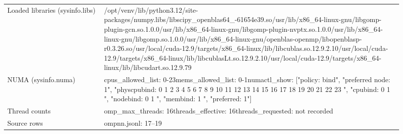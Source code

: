 \begin{longtable}{>{\raggedright\arraybackslash}p{0.23\linewidth}>{\raggedright\arraybackslash}p{0.71\linewidth}}
Loaded libraries (sysinfo.libs) & /\allowbreak{}opt/\allowbreak{}venv/\allowbreak{}lib/\allowbreak{}python3.12/\allowbreak{}site-packages/\allowbreak{}numpy.libs/\allowbreak{}libscipy\_\allowbreak{}openblas64\_\allowbreak{}-61654e39.so\newline /\allowbreak{}usr/\allowbreak{}lib/\allowbreak{}x86\_\allowbreak{}64-linux-gnu/\allowbreak{}libgomp-plugin-gcn.so.1.0.0\newline /\allowbreak{}usr/\allowbreak{}lib/\allowbreak{}x86\_\allowbreak{}64-linux-gnu/\allowbreak{}libgomp-plugin-nvptx.so.1.0.0\newline /\allowbreak{}usr/\allowbreak{}lib/\allowbreak{}x86\_\allowbreak{}64-linux-gnu/\allowbreak{}libgomp.so.1.0.0\newline /\allowbreak{}usr/\allowbreak{}lib/\allowbreak{}x86\_\allowbreak{}64-linux-gnu/\allowbreak{}openblas-openmp/\allowbreak{}libopenblasp-r0.3.26.so\newline /\allowbreak{}usr/\allowbreak{}local/\allowbreak{}cuda-12.9/\allowbreak{}targets/\allowbreak{}x86\_\allowbreak{}64-linux/\allowbreak{}lib/\allowbreak{}libcublas.so.12.9.2.10\newline /\allowbreak{}usr/\allowbreak{}local/\allowbreak{}cuda-12.9/\allowbreak{}targets/\allowbreak{}x86\_\allowbreak{}64-linux/\allowbreak{}lib/\allowbreak{}libcublasLt.so.12.9.2.10\newline /\allowbreak{}usr/\allowbreak{}local/\allowbreak{}cuda-12.9/\allowbreak{}targets/\allowbreak{}x86\_\allowbreak{}64-linux/\allowbreak{}lib/\allowbreak{}libcudart.so.12.9.79 \\
NUMA (sysinfo.numa) & cpus\_\allowbreak{}allowed\_\allowbreak{}list: 0-23\newline mems\_\allowbreak{}allowed\_\allowbreak{}list: 0-1\newline numactl\_\allowbreak{}show: ["policy: bind", "preferred node: 1", "physcpubind: 0 1 2 3 4 5 6 7 8 9 10 11 12 13 14 15 16 17 18 19 20 21 22 23 ", "cpubind: 0 1 ", "nodebind: 0 1 ", "membind: 1 ", "preferred: 1"] \\
Thread counts & omp\_\allowbreak{}max\_\allowbreak{}threads: 16\newline threads\_\allowbreak{}effective: 16\newline threads\_\allowbreak{}requested: not recorded \\
Source rows & ompnn.jsonl: 17–19 \\
\end{longtable}
